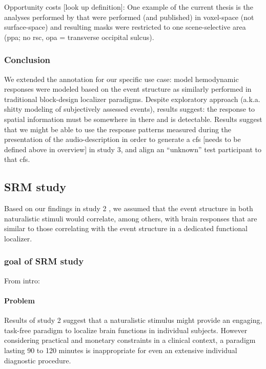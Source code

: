 %
Opportunity costs [look up definition]: One example of the current thesis is the
analyses performed by \citet{sengupta2016extension} that were performed (and
published) in voxel-space (not surface-space) and resulting masks were
restricted to one scene-selective area (\ac{ppa}; no \ac{rsc}, \ac{opa} =
transverse occipital sulcus).


\subsubsection{Conclusion}
%
We extended the annotation for our specific use case:
%
model hemodynamic responses were modeled based on the event structure as
similarly performed in traditional block-design localizer paradigms.
%
Despite exploratory approach (a.k.a. shitty modeling of subjectively assessed
events), results suggest:
%
the response to spatial information must be somewhere in there and is
detectable.
%
Results suggest that we might be able to use the response patterns
measured during the presentation of the audio-description in order to generate a
\ac{cfs} [needs to be defined above in overview] in study 3, and
align an ``unknown'' test participant to that \ac{cfs}.


\subsection{SRM study}

Based on our findings in study 2 \citep{haeusler2022processing}, we assumed that
the event structure in both naturalistic stimuli would correlate, among others,
with brain responses that are similar to those correlating with the event
structure in a dedicated functional localizer.

\subsubsection{goal of SRM study}

From intro:
\paragraph{Problem}
Results of study 2 suggest that a naturalistic stimulus might provide an
engaging, task-free paradigm to localize brain functions in individual subjects.
%
However considering practical and monetary constraints in a clinical context, a
paradigm lasting 90 to 120 minutes is inappropriate for even an extensive
individual diagnostic procedure.


